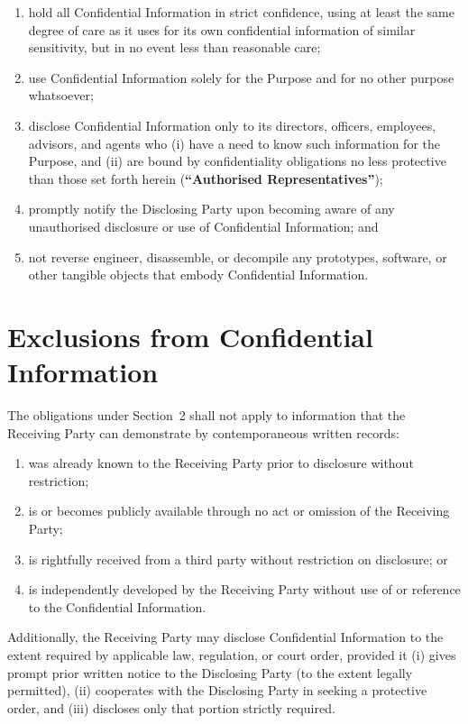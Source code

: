 \documentclass[11pt, a4paper]{article}
\newcommand{\term}[1]{\textbf{``#1''}}
\begin{document}
\begin{enumerate}
  \item hold all Confidential Information in strict confidence, using at least
        the same degree of care as it uses for its own confidential information
        of similar sensitivity, but in no event less than reasonable care;
  \item use Confidential Information solely for the Purpose and for no other
        purpose whatsoever;
  \item disclose Confidential Information only to its directors, officers,
        employees, advisors, and agents who (i) have a need to know such
        information for the Purpose, and (ii) are bound by confidentiality
        obligations no less protective than those set forth herein
        (\term{Authorised Representatives});
  \item promptly notify the Disclosing Party upon becoming aware of any
        unauthorised disclosure or use of Confidential Information; and
  \item not reverse engineer, disassemble, or decompile any prototypes,
        software, or other tangible objects that embody Confidential Information.
\end{enumerate}

\section{Exclusions from Confidential Information}

\noindent
The obligations under Section~2 shall not apply to information that the
Receiving Party can demonstrate by contemporaneous written records:

\begin{enumerate}
  \item was already known to the Receiving Party prior to disclosure without
        restriction;
  \item is or becomes publicly available through no act or omission of the
        Receiving Party;
  \item is rightfully received from a third party without restriction on
        disclosure; or
  \item is independently developed by the Receiving Party without use of
        or reference to the Confidential Information.
\end{enumerate}

\noindent
Additionally, the Receiving Party may disclose Confidential Information to the
extent required by applicable law, regulation, or court order, provided it
(i) gives prompt prior written notice to the Disclosing Party (to the extent
legally permitted), (ii) cooperates with the Disclosing Party in seeking a
protective order, and (iii) discloses only that portion strictly required.
\end{document}

